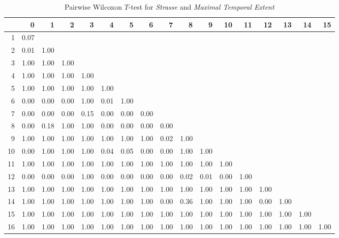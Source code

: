 \begin{table}[ht!]
	\tiny
	\setlength{\tabcolsep}{4pt}
	\centering
  \begin{tabular}{rrrrrrrrrrrrrrrrr}
    \hline
   & 0 & 1 & 2 & 3 & 4 & 5 & 6 & 7 & 8 & 9 & 10 & 11 & 12 & 13 & 14 & 15 \\ 
    \hline
  1 & 0.07 &  &  &  &  &  &  &  &  &  &  &  &  &  &  &  \\ 
    2 & 0.01 & 1.00 &  &  &  &  &  &  &  &  &  &  &  &  &  &  \\ 
    3 & 1.00 & 1.00 & 1.00 &  &  &  &  &  &  &  &  &  &  &  &  &  \\ 
    4 & 1.00 & 1.00 & 1.00 & 1.00 &  &  &  &  &  &  &  &  &  &  &  &  \\ 
    5 & 1.00 & 1.00 & 1.00 & 1.00 & 1.00 &  &  &  &  &  &  &  &  &  &  &  \\ 
    6 & 0.00 & 0.00 & 0.00 & 1.00 & 0.01 & 1.00 &  &  &  &  &  &  &  &  &  &  \\ 
    7 & 0.00 & 0.00 & 0.00 & 0.15 & 0.00 & 0.00 & 0.00 &  &  &  &  &  &  &  &  &  \\ 
    8 & 0.00 & 0.18 & 1.00 & 1.00 & 0.00 & 0.00 & 0.00 & 0.00 &  &  &  &  &  &  &  &  \\ 
    9 & 1.00 & 1.00 & 1.00 & 1.00 & 1.00 & 1.00 & 1.00 & 0.02 & 1.00 &  &  &  &  &  &  &  \\ 
    10 & 0.00 & 1.00 & 1.00 & 1.00 & 0.04 & 0.05 & 0.00 & 0.00 & 1.00 & 1.00 &  &  &  &  &  &  \\ 
    11 & 1.00 & 1.00 & 1.00 & 1.00 & 1.00 & 1.00 & 1.00 & 1.00 & 1.00 & 1.00 & 1.00 &  &  &  &  &  \\ 
    12 & 0.00 & 0.00 & 0.00 & 1.00 & 0.00 & 0.00 & 0.00 & 0.00 & 0.02 & 0.01 & 0.00 & 1.00 &  &  &  &  \\ 
    13 & 1.00 & 1.00 & 1.00 & 1.00 & 1.00 & 1.00 & 1.00 & 1.00 & 1.00 & 1.00 & 1.00 & 1.00 & 1.00 &  &  &  \\ 
    14 & 1.00 & 1.00 & 1.00 & 1.00 & 1.00 & 1.00 & 1.00 & 0.00 & 0.36 & 1.00 & 1.00 & 1.00 & 0.00 & 1.00 &  &  \\ 
    15 & 1.00 & 1.00 & 1.00 & 1.00 & 1.00 & 1.00 & 1.00 & 1.00 & 1.00 & 1.00 & 1.00 & 1.00 & 1.00 & 1.00 & 1.00 &  \\ 
    16 & 1.00 & 1.00 & 1.00 & 1.00 & 1.00 & 1.00 & 1.00 & 1.00 & 1.00 & 1.00 & 1.00 & 1.00 & 1.00 & 1.00 & 1.00 & 1.00 \\ 
     \hline
  \end{tabular}
	\caption{Pairwise Wilcoxon $T$-test for \textit{Strasse} and \textit{Maximal Temporal Extent}}
	\label{tbl:wilcoxon_baysis_matched_Strasse_TMax}
\end{table}
